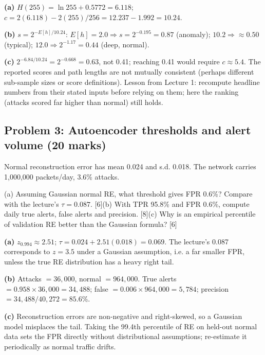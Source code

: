 \documentclass[11pt]{article}
\begin{document}
\begin{soln}\textbf{(a)} $H(255)=\ln255+0.5772=6.118$; $c=2(6.118)-2(255)/256=12.237-1.992=\mathbf{10.24}$.

\textbf{(b)} $s=2^{-E[h]/10.24}$: $E[h]=2.0\Rightarrow s=2^{-0.195}=\mathbf{0.87}$ (anomaly); $10.2\Rightarrow\approx\mathbf{0.50}$ (typical); $12.0\Rightarrow2^{-1.17}=\mathbf{0.44}$ (deep, normal).

\textbf{(c)} $2^{-6.84/10.24}=2^{-0.668}=0.63$, not 0.41; reaching 0.41 would require $c\approx5.4$. The reported scores and path lengths are not mutually consistent (perhaps different sub-sample sizes or score definitions). Lesson from Lecture 1: recompute headline numbers from their stated inputs before relying on them; here the ranking (attacks scored far higher than normal) still holds.\end{soln}

\subsection{Problem 3: Autoencoder thresholds and alert volume \normalfont\small\color{GreyN}(20 marks)}

\begin{prob}Normal reconstruction error has mean 0.024 and s.d. 0.018. The network carries 1,000,000 packets/day, 3.6\% attacks.

(a) Assuming Gaussian normal RE, what threshold gives FPR 0.6\%? Compare with the lecture's $\tau=0.087$. [6]\newline (b) With TPR 95.8\% and FPR 0.6\%, compute daily true alerts, false alerts and precision. [8]\newline (c) Why is an empirical percentile of validation RE better than the Gaussian formula? [6]\end{prob}

\begin{soln}\textbf{(a)} $z_{0.994}\approx2.51$; $\tau=0.024+2.51(0.018)=\mathbf{0.069}$. The lecture's 0.087 corresponds to $z=3.5$ under a Gaussian assumption, i.e. a far smaller FPR, unless the true RE distribution has a heavy right tail.

\textbf{(b)} Attacks $=36{,}000$, normal $=964{,}000$. True alerts $=0.958\times36{,}000=34{,}488$; false $=0.006\times964{,}000=5{,}784$; precision $=34{,}488/40{,}272=\mathbf{85.6\%}$.

\textbf{(c)} Reconstruction errors are non-negative and right-skewed, so a Gaussian model misplaces the tail. Taking the 99.4th percentile of RE on held-out normal data sets the FPR directly without distributional assumptions; re-estimate it periodically as normal traffic drifts.\end{soln}
\end{document}
